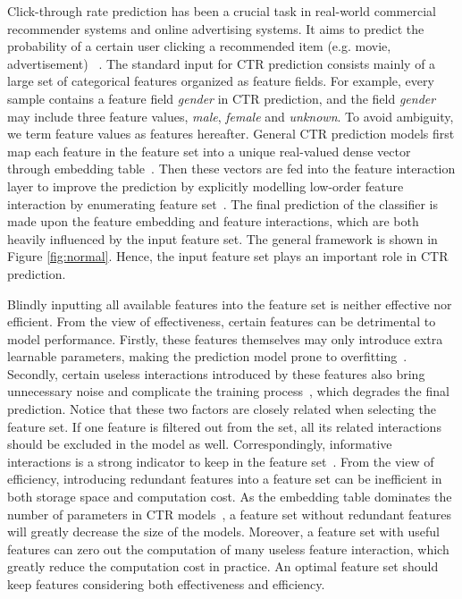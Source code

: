 \documentclass[sigconf]{acmart}
\begin{document}
Click-through rate prediction has been a crucial task in real-world commercial recommender systems and online advertising systems. It aims to predict the probability of a certain user clicking a recommended item (e.g. movie, advertisement) ~\cite{LR, ADS}. The standard input for CTR prediction consists mainly of a large set of categorical features organized as feature fields. For example, every sample contains a feature field \textit{gender} in CTR prediction, and the field \textit{gender} may include three feature values, \textit{male}, \textit{female} and \textit{unknown}. To avoid ambiguity, we term feature values as features hereafter. General CTR prediction models first map each feature in the feature set into a unique real-valued dense vector through embedding table~\cite{OptEmbed}. Then these vectors are fed into the feature interaction layer to improve the prediction by explicitly modelling low-order feature interaction by enumerating feature set~\cite{AutoPI}. The final prediction of the classifier is made upon the feature embedding and feature interactions, which are both heavily influenced by the input feature set. The general framework is shown in Figure \ref{fig:normal}. Hence, the input feature set plays an important role in CTR prediction.

Blindly inputting all available features into the feature set is neither effective nor efficient. From the view of effectiveness, certain features can be detrimental to model performance. Firstly, these features themselves may only introduce extra learnable parameters, making the prediction model prone to overfitting~\cite{RLReview, Elements_SL}. Secondly, certain useless interactions introduced by these features also bring unnecessary noise and complicate the training process~\cite{AutoFIS}, which degrades the final prediction. Notice that these two factors are closely related when selecting the feature set. If one feature  is filtered out from the set, all its related interactions  should be excluded in the model as well. Correspondingly, informative interactions  is a strong indicator to keep  in the feature set~\cite{AutoCross}. From the view of efficiency, introducing redundant features into a feature set can be inefficient in both storage space and computation cost. As the embedding table dominates the number of parameters in CTR models~\cite{sfctr}, a feature set without redundant features will greatly decrease the size of the models. Moreover, a feature set with useful features can zero out the computation of many useless feature interaction, which greatly reduce the computation cost in practice. An optimal feature set should keep features considering both effectiveness and efficiency.
\end{document}
